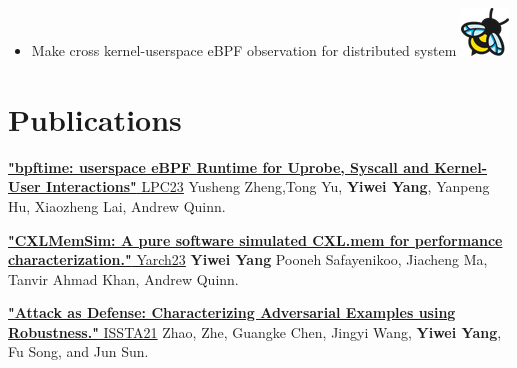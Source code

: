 \documentclass{resume}
\newcommand{\en}[1]{#1}
\newcommand{\zh}[1]{}
\begin{document}
\begin{itemize}
      \item \small{ \en{Make cross kernel-userspace eBPF observation for distributed system}
      \zh{设计一种基于用户态内核态eBPF协同工作的分布式系统。}}\includegraphics[width=\linewidth/38]{ebpf.png}
\end{itemize}

\section{\en{Publications}\zh{论文}}
\href{https://arxiv.org/abs/2311.07923.pdf}{\textbf{"bpftime: userspace eBPF Runtime for Uprobe, Syscall and Kernel-User Interactions"} LPC23} Yusheng Zheng,Tong Yu, \textbf{Yiwei Yang}, Yanpeng Hu, Xiaozheng Lai, Andrew Quinn.

\href{https://arxiv.org/pdf/2303.06153.pdf}{\textbf{"CXLMemSim: A pure software simulated CXL.mem for performance characterization."} Yarch23} \textbf{Yiwei Yang} Pooneh Safayenikoo, Jiacheng Ma, Tanvir Ahmad Khan, Andrew Quinn.

\href{https://arxiv.org/pdf/2103.07633.pdf}{\textbf{"Attack as Defense: Characterizing Adversarial Examples using Robustness."} ISSTA21} Zhao, Zhe, Guangke Chen, Jingyi Wang, \textbf{Yiwei Yang}, Fu Song, and Jun Sun. 
      
\end{document}
